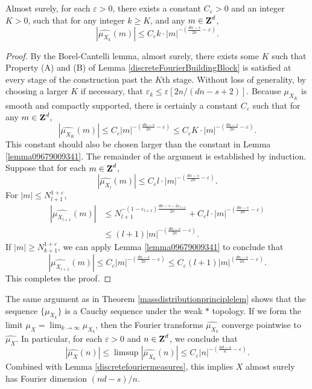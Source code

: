 \begin{lemma}
    Almost surely, for each $\varepsilon > 0$, there exists a constant $C_\varepsilon > 0$ and an integer $K > 0$, such that for any integer $k \geq K$, and any $m \in \operatorname{\mathbf{Z}}^d$,
    \[ |\widehat{\mu_{X_k}}(m)| \leq C_\varepsilon k \cdot |m|^{- \left( \frac{dn - s}{2n} - \varepsilon \right)}. \]
\end{lemma}
\begin{proof}
    By the Borel-Cantelli lemma, almost surely, there exists some $K$ such that Property (A) and (B) of Lemma \ref{discreteFourierBuildingBlock} is satisfied at every stage of the construction past the $K$th stage. Without loss of generality, by choosing a larger $K$ if necessary, that $\varepsilon_k \leq \varepsilon [2n/(dn - s + 2)]$. Because $\mu_{X_K}$ is smooth and compactly supported, there is certainly a constant $C_\varepsilon$ such that for any $m \in \operatorname{\mathbf{Z}}^d$,
    \[ |\widehat{\mu_{X_K}}(m)| \leq C_\varepsilon |m|^{- \left( \frac{dn - s}{2n} - \varepsilon \right)} \leq C_\varepsilon K \cdot |m|^{- \left( \frac{dn - s}{2n} - \varepsilon \right)}. \]
    This constant should also be chosen larger than the constant in Lemma \ref{lemma09679009341}. The remainder of the argument is established by induction. Suppose that for each $m \in \operatorname{\mathbf{Z}}^d$,
    \[ |\widehat{\mu_{X_l}}(m)| \leq C_\varepsilon l \cdot |m|^{- \left( \frac{dn - s}{2n} - \varepsilon \right)}. \]
    For $|m| \leq N_{l+1}^{1 + \varepsilon}$,
    \begin{align*}
        |\widehat{\mu_{X_{l+1}}}(m)| &\leq N_{l+1}^{-(1-\varepsilon_{l+1}) \frac{dn - s - 2\varepsilon_{l+1}}{2n}} + C_\varepsilon l \cdot |m|^{- \left( \frac{dn - s}{2n} - \varepsilon \right)}\\
        &\leq (l + 1) |m|^{- \left( \frac{dn - s}{2n} - \varepsilon \right)}.
    \end{align*}
    If $|m| \geq N_{k+1}^{1 + \varepsilon}$, we can apply Lemma \ref{lemma09679009341} to conclude that
    \[ |\widehat{\mu_{X_{l+1}}}(m)| \leq C_\varepsilon |m|^{- \left( \frac{dn - s}{2n} - \varepsilon \right)} \leq C_\varepsilon (l+1) |m|^{\left( \frac{dn - s}{2n} - \varepsilon \right)}. \]
    This completes the proof.
\end{proof}

The same argument as in Theorem \ref{massdistributionprinciplelem} shows that the sequence $\{ \mu_{X_k} \}$ is a Cauchy sequence under the weak $*$ topology. If we form the limit $\mu_X = \lim_{k \to \infty} \mu_{X_k}$, then the Fourier transforms $\widehat{\mu_{X_k}}$ converge pointwise to $\widehat{\mu_X}$. In particular, for each $\varepsilon > 0$ and $n \in \operatorname{\mathbf{Z}}^d$, we conclude that
%
\[ |\widehat{\mu_X}(n)| \leq \limsup |\widehat{\mu_{X_k}}(n)| \leq C_\varepsilon |n|^{- \left( \frac{nd - s}{n} - \varepsilon \right)}. \]
%
Combined with Lemma \ref{discretefouriermeasures}, this implies $X$ almost surely has Fourier dimension $(nd - s)/n$.

\endinput